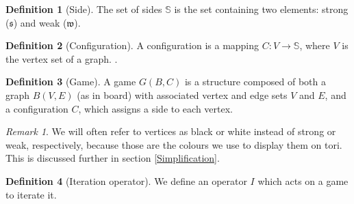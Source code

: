 \documentclass[12pt]{article}
\theoremstyle{definition}
\newtheorem{definition}{Definition}%
\theoremstyle{remark}
\newtheorem{remark}{Remark}%
\theoremstyle{remark}
\begin{document}
\begin{definition}[Side]
The set of sides $\mathbb{S}$ is the set containing two elements: strong ($\mathfrak{s}$) and weak ($\mathfrak{w}$). %
\end{definition}
\begin{definition}[Configuration]
A configuration is a mapping $C\colon V \to \mathbb{S}$, where $V$ is the vertex set of a graph. \cite{ref:graphs}. 
\end{definition}
\begin{definition}[Game]
A game $G(B,C)$ is a structure composed of both a graph $B(V,E)$ (as in board) with associated vertex and edge sets $V$ and $E$, and a configuration $C$, which assigns a side to each vertex.
\end{definition}
\begin{remark}
We will often refer to vertices as black or white instead of strong or weak, respectively, because those are the colours we use to display them on tori. This is discussed further in section \ref{Simplification}.
\end{remark}

\begin{definition}[Iteration operator]
We define an operator $I$ which acts on a game to iterate it. %
\end{definition}

\end{document}

